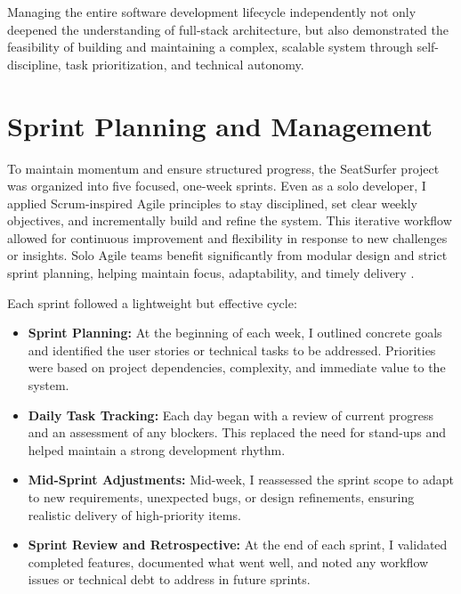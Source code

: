 \documentclass[12pt,a4paper]{report} %
\begin{document}
Managing the entire software development lifecycle independently not only deepened the understanding of full-stack architecture, but also demonstrated the feasibility of building and maintaining a complex, scalable system through self-discipline, task prioritization, and technical autonomy.

\section{Sprint Planning and Management}

To maintain momentum and ensure structured progress, the SeatSurfer project was organized into five focused, one-week sprints. Even as a solo developer, I applied Scrum-inspired Agile principles to stay disciplined, set clear weekly objectives, and incrementally build and refine the system. This iterative workflow allowed for continuous improvement and flexibility in response to new challenges or insights. Solo Agile teams benefit significantly from modular design and strict sprint planning, helping maintain focus, adaptability, and timely delivery \cite{zhang2023agiletesting}.

Each sprint followed a lightweight but effective cycle:

\begin{itemize}
    \item \textbf{Sprint Planning:} At the beginning of each week, I outlined concrete goals and identified the user stories or technical tasks to be addressed. Priorities were based on project dependencies, complexity, and immediate value to the system.
    \item \textbf{Daily Task Tracking:} Each day began with a review of current progress and an assessment of any blockers. This replaced the need for stand-ups and helped maintain a strong development rhythm.
    \item \textbf{Mid-Sprint Adjustments:} Mid-week, I reassessed the sprint scope to adapt to new requirements, unexpected bugs, or design refinements, ensuring realistic delivery of high-priority items.
    \item \textbf{Sprint Review and Retrospective:} At the end of each sprint, I validated completed features, documented what went well, and noted any workflow issues or technical debt to address in future sprints.
\end{itemize}
\end{document}
